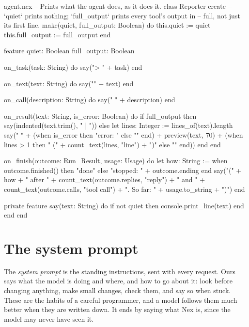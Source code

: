\begin{append}{agent.nex}
-- Prints what the agent does, as it does it.
class Reporter
create
  -- `quiet` prints nothing; `full_output` prints every tool's output in
  -- full, not just its first line.
  make(quiet, full_output: Boolean) do
    this.quiet := quiet
    this.full_output := full_output
  end

feature
  quiet: Boolean
  full_output: Boolean

  on_task(task: String) do
    say("\n> " + task)
  end

  on_text(text: String) do
    say("\n" + text)
  end

  on_call(description: String) do
    say("  " + description)
  end

  on_result(text: String, is_error: Boolean) do
    if full_output then
      say(indented(text.trim(), "    | "))
    else
      let lines: Integer := lines_of(text).length
      say("    " + (when is_error then "error: " else "" end) + preview(text, 70)
        + (when lines > 1 then "  (" + count_text(lines, "line") + ")" else "" end))
    end
  end

  on_finish(outcome: Run_Result, usage: Usage) do
    let how: String := when outcome.finished() then "done" else "stopped: " + outcome.ending end
    say("\n(" + how + " after " + count_text(outcome.replies, "reply") + " and "
      + count_text(outcome.calls, "tool call") + ". So far: " + usage.to_string + ")")
  end

  private feature
    say(text: String) do
      if not quiet then
        console.print_line(text)
      end
    end
end
\end{append}

\section{The system prompt}

The \emph{system prompt} is the standing instructions, sent with every
request. Ours says what the model is doing and where, and how to go about
it: look before changing anything, make small changes, check them, and say
so when stuck. These are the habits of a careful programmer, and a model
follows them much better when they are written down. It ends by saying
what Nex is, since the model may never have seen it.

